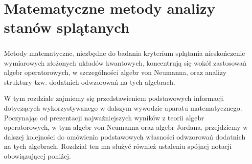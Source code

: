 \chapter{Matematyczne metody analizy stanów splątanych}
\label{chp:preliminaries}

\paragraph{}
Metody matematyczne,
niezbędne do badania kryterium splątania nieskończenie wymiarowych złożonych
układów kwantowych, koncentrują się wokół zastosowań algebr operatorowych,
w szczególności algebr von Neumanna,
oraz analizy struktury tzw. dodatnich odwzorowań na tych algebrach.

W tym rozdziale zajmiemy się przedstawieniem podstawowych informacji dotyczących
wykorzystywanego w dalszym wywodzie aparatu matematycznego.
Poczynając od prezentacji najważniejszych wyników z teorii algebr operatorowych,
w tym algebr von Neumanna oraz algebr Jordana,
przejdziemy
w dalszej kolejności do omówienia podstawowych własności
odwzorowań dodatnich na tych algebrach.
Rozdział ten ma służyć również ustaleniu spójnej notacji obowiązującej poniżej.

